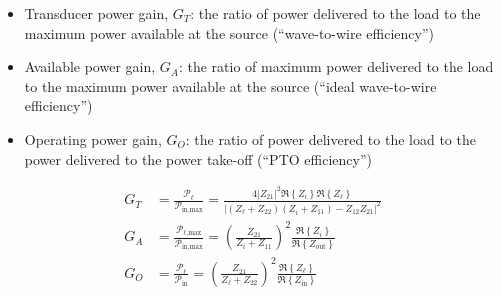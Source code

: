 \documentclass[5p,times]{elsarticle}
\begin{document}
\begin{itemize}
        \item Transducer power gain, $G_T$: the ratio of power delivered to the load to the maximum power available at the source (``wave-to-wire efficiency'')
        \item Available power gain, $G_A$: the ratio of maximum power delivered to the load to the maximum power available at the source (``ideal wave-to-wire efficiency'')
        \item Operating power gain, $G_O$: the ratio of power delivered to the load to the power delivered to the power take-off (``PTO efficiency'')
\end{itemize}
%
\begin{subequations}
\begin{align}
        G_T 
        &= \frac{\mathcal{P}_\ell}{\mathcal{P}_{\textrm{in,max}}} 
        = \frac{4 \left| Z_{21} \right|^2 \Re \left\{ Z_i \right\}\Re \left\{ Z_{\ell} \right\}}{ \left| (Z_{\ell} + Z_{22})(Z_i + Z_{11}) - Z_{12}Z_{21} \right|^2} 
        \label{eq:transducer_gain}
        \\[1em]
        G_A 
        &= \frac{\mathcal{P}_{\ell\textrm{,max}}}{\mathcal{P}_{\textrm{in,max}}} 
        = \left(\frac{Z_{21}}{Z_i + Z_{11}}\right)^2\frac{\Re \left\{ Z_i \right\}}{\Re \left\{ Z_{\textrm{out}} \right\}}
        \label{eq:available_gain}
        \\[1em]
        G_O 
        &= \frac{\mathcal{P}_\ell}{\mathcal{P}_{\textrm{in}}} 
        = \left(\frac{Z_{21}}{Z_{\ell} + Z_{22}}\right)^2\frac{\Re \left\{ Z_{\ell} \right\}}{\Re \left\{ Z_{\textrm{in}} \right\}} 
        \label{eq:operating_gain}
\end{align}
\label{eq:gains}
\end{subequations}
\end{document}
